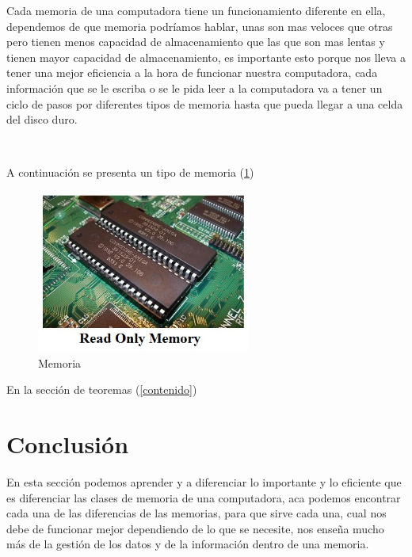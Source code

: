 \documentclass{article}
\begin{document}
Cada memoria de una computadora tiene un funcionamiento diferente en ella, dependemos de que memoria podríamos hablar, unas son mas veloces que otras pero tienen menos capacidad de almacenamiento que las que son mas lentas y tienen mayor capacidad de almacenamiento, es importante esto porque nos lleva a tener una mejor eficiencia a la hora de funcionar nuestra computadora, cada información que se le escriba o se le pida leer a la computadora va a tener un ciclo de pasos por diferentes tipos de memoria hasta que pueda llegar a una celda del disco duro.
\\
\\


\begin{lstlisting}

\end{lstlisting}

A continuación se presenta un tipo de memoria (\ref{fig:memoria})

\begin{figure}[h]
\includegraphics[width=7cm]{memoria.jpg}
\centering
\caption{Memoria}
\label{fig:memoria}
\end{figure}

En la sección de teoremas (\ref{contenido})

\section{Conclusión} \label{conclulsion}
En esta sección podemos aprender y a diferenciar lo importante y lo eficiente que es diferenciar las clases de memoria de una computadora, aca podemos encontrar cada una de las diferencias de las memorias, para que sirve cada una, cual nos debe de funcionar mejor dependiendo de lo que se necesite, nos enseña mucho más de la gestión de los datos y de la información dentro de una memoria.


\end{document}
